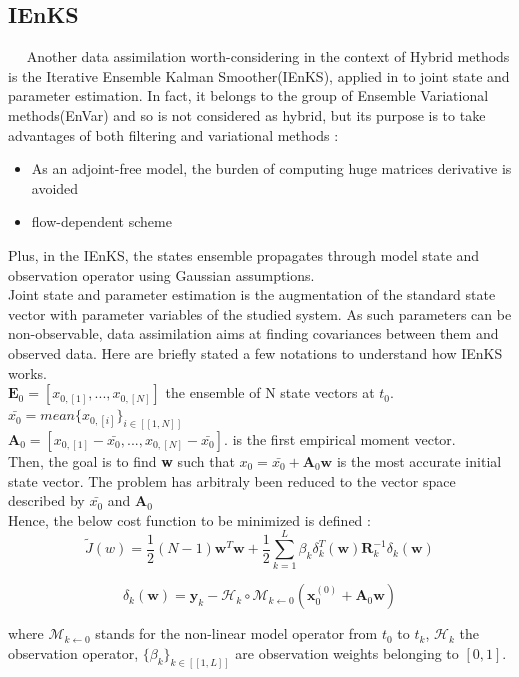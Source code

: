 \documentclass[a4,12pt]{article}
\numberwithin{equation}{section}
\begin{document}
\subsection{IEnKS}
~~ Another data assimilation worth-considering in the context of Hybrid methods is the Iterative Ensemble Kalman Smoother(IEnKS), applied in \cite{jointState} to joint state and parameter estimation. In fact, it belongs to the group of Ensemble Variational methods(EnVar) and so is not considered as hybrid, but its purpose is to take advantages of both filtering and variational methods :
\begin{itemize}
\item As an adjoint-free model, the burden of computing huge matrices derivative is avoided
\item flow-dependent scheme
\end{itemize}
Plus, in the IEnKS, the states ensemble propagates through model state and observation operator using Gaussian assumptions. \\
Joint state and parameter estimation is the augmentation of the standard state vector with parameter variables of the studied system. As such parameters can be non-observable, data assimilation aims at finding covariances between them and observed data.
Here are briefly stated a few notations to understand how IEnKS works. \\
$\textbf{E}_0 = [x_{0,[1]},...,x_{0,[N]}]$ the ensemble of N state vectors at $t_0$. \\
$\bar{x_0} = mean\{x_{0,[i]}\}_{i \in [\![1,N]\!] }$ \\
$\textbf{A}_0 = [x_{0,[1]} - \bar{x_0},...,x_{0,[N]}- \bar{x_0}]$. is the first empirical moment vector.\\
Then, the goal is to find \textbf{w} such that $x_0 = \bar{x_0} + \textbf{A}_0 \textbf{w}$ is the most accurate initial state vector. The problem has arbitraly been reduced to the vector space described by $\bar{x_0}$ and $\textbf{A}_0$ \\
Hence, the below cost function to be minimized is defined : 
$$\tilde{J}(w) = \frac{1}{2}(N-1)\textbf{w}^{T}\textbf{w} + \frac{1}{2}\sum_{k=1}^{L}\beta_{k}\delta_{k}^{T}(\textbf{w})\textbf{R}_{k}^{-1}\delta_{k}(\textbf{w})$$

$$\delta_{k}(\textbf{w}) = \textbf{y}_{k} - \mathcal{H}_{k}\circ \mathcal{M}_{k\leftarrow 0}(\textbf{x}_{0}^{(0)} + \textbf{A}_{0}\textbf{w})$$

where $\mathcal{M}_{k\leftarrow 0}$ stands for the non-linear model operator from $t_{0}$ to $t_{k}$, $\mathcal{H}_{k}$ the observation operator, $\{\beta_k\}_{k \in [\![1,L]\!]}$ are observation weights belonging to $[0,1]$. 
\end{document}
